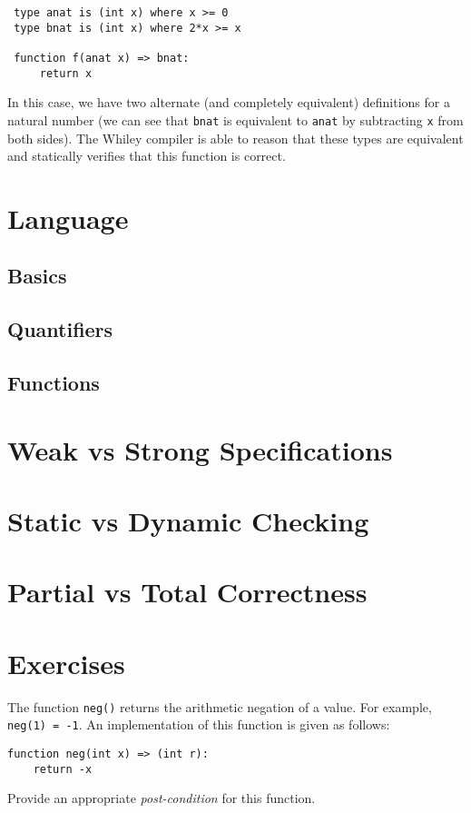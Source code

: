 \begin{lstlisting}
 type anat is (int x) where x >= 0
 type bnat is (int x) where 2*x >= x

 function f(anat x) => bnat:
     return x
\end{lstlisting}
In this case, we have two alternate (and completely equivalent)
definitions for a natural number (we can see that \lstinline{bnat} is
equivalent to \lstinline{anat} by subtracting \lstinline{x} from both sides).
The Whiley compiler is able to reason that these types are equivalent
and statically verifies that this function is correct.
\section{Language}
\subsection{Basics}
\subsection{Quantifiers}
\subsection{Functions}
\section{Weak vs Strong Specifications}
\section{Static vs Dynamic Checking}
\section{Partial vs Total Correctness}

\section{Exercises}

\begin{ex}
The function \lstinline{neg()} returns the arithmetic negation of a value.
For example, \lstinline{neg(1) = -1}.  An implementation of
this function is given as follows:
\begin{lstlisting}
function neg(int x) => (int r):
    return -x
\end{lstlisting}
Provide an appropriate {\em post-condition} for this function.
\end{ex}

